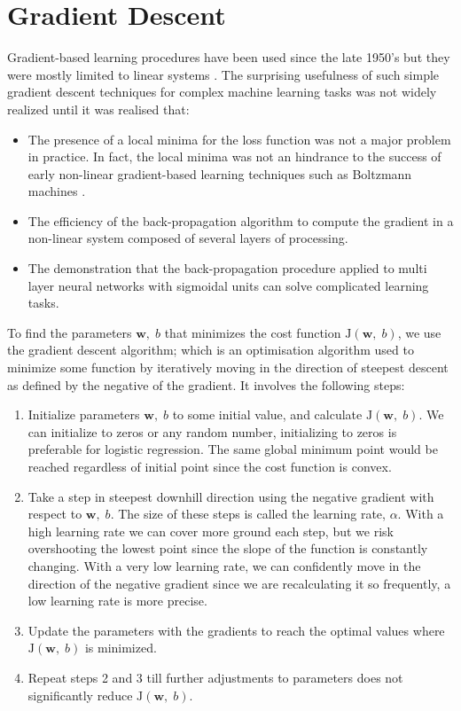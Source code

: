 \documentclass[12pt]{report}
\numberwithin{equation}{section}
\begin{document}
\section{Gradient Descent}\label{sec:gd}
Gradient-based learning procedures have been used since the late 1950's but they were mostly limited to linear systems {\cite{dudaHart1973}}. The surprising usefulness of such simple gradient descent techniques for complex machine learning tasks was not widely realized until it was realised that:
\begin{itemize}[label = -]
\item The presence of a local minima for the loss function was not a major problem in practice. In fact, the local minima was not an hindrance to the  success of early non-linear gradient-based learning techniques such as Boltzmann machines {\cite{ahs-labm-85}}.
\item The efficiency of the back-propagation algorithm to compute the gradient in a non-linear system composed of several layers of processing.
\item The demonstration that the back-propagation procedure applied to multi layer neural networks with sigmoidal units can solve complicated learning tasks.
\end{itemize}
To find the parameters $\bm{w},\;b$ that minimizes the cost function $\mathrm{J}(\bm{w},\;b)$, we use the gradient descent algorithm; which is an optimisation algorithm used to minimize some function by iteratively moving in the direction of steepest descent as defined by the negative of the gradient. It involves the following steps:
\begin{enumerate}
\item Initialize parameters $\bm{w},\; b$ to some initial value, and calculate $\mathrm{J}(\bm{w},\;b)$. We can initialize to zeros or any random number, initializing to zeros is preferable for logistic regression. The same global minimum point would be reached regardless of initial point since the cost function is convex. 
\item Take a step in steepest downhill direction using the negative gradient with respect to $\bm{w}, \; b$. The size of these steps is called the learning rate, $\alpha$. With a high learning rate we can cover more ground each step, but we risk overshooting the lowest point since the slope of the function is constantly changing. With a very low learning rate, we can confidently move in the direction of the negative gradient since we are recalculating it so frequently, a low learning rate is more precise. 
\item Update the parameters with the gradients to reach the optimal values where $\mathrm{J}(\bm{w},\;b)$ is minimized.
\item Repeat steps 2 and 3 till further adjustments to parameters does not significantly reduce $\mathrm{J}(\bm{w},\;b)$.
\end{enumerate}
\end{document}
